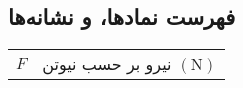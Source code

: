 \begin{center}
\section*{فهرست نمادها، و نشانه‌ها}
\end{center}




\begin{xltabular}[H]{0.9\textwidth}{l X}
$F$     & نیرو بر حسب نیوتن $(\mathrm{N})$ \\
\end{xltabular}
\newpage